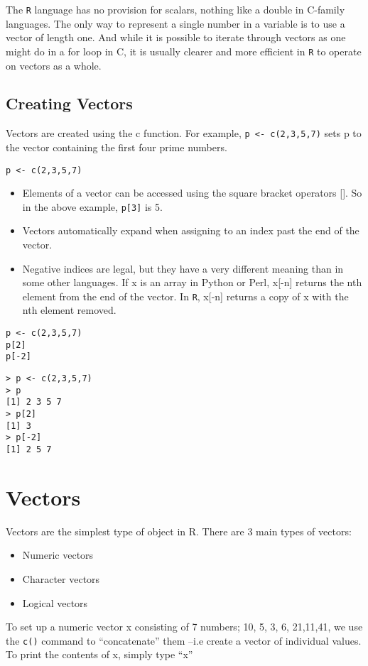 \documentclass[a4paper,12pt]{article}
\begin{document}
The \texttt{R}  language has no provision for scalars, nothing like a double in C-family languages. The only way to represent a single number in a variable is to use a vector of length one. And while it is possible to iterate through vectors as one might do in a for loop in C, it is usually clearer and more efficient in \texttt{R} to operate on vectors as a whole.

\subsection{Creating Vectors}
Vectors are created using the c function. For example, \texttt{p <- c(2,3,5,7)} sets p to the vector containing the first four prime numbers.
\begin{framed}
\begin{verbatim}
p <- c(2,3,5,7)
\end{verbatim}
\end{framed}

\begin{itemize}
\item Elements of a vector can be accessed using the square bracket operators []. So in the above example, \texttt{p[3]} is 5.

\item Vectors automatically expand when assigning to an index past the end of the vector.

\item Negative indices are legal, but they have a very different meaning than in some other languages. If x is an array in Python or Perl, x[-n] returns the nth element from the end of the vector. In \texttt{R}, x[-n] returns a copy of x with the nth element removed.
\end{itemize}

\begin{framed}
\begin{verbatim}
p <- c(2,3,5,7)
p[2]
p[-2]
\end{verbatim}
\end{framed}

\begin{verbatim}
> p <- c(2,3,5,7)
> p
[1] 2 3 5 7
> p[2]
[1] 3
> p[-2]
[1] 2 5 7
\end{verbatim}


\newpage
\section{Vectors}
 Vectors are the simplest type of object in R. There are 3 main types of vectors:
\begin{itemize}
\item  Numeric vectors
\item Character vectors
\item Logical vectors
\end{itemize}
To set up a numeric vector x consisting of 7 numbers; {10, 5, 3, 6, 21,11,41}, we use the \texttt{c()} command to “concatenate” them –i.e create a vector of individual values.
To print the contents of x, simply type “x”
\end{document}
